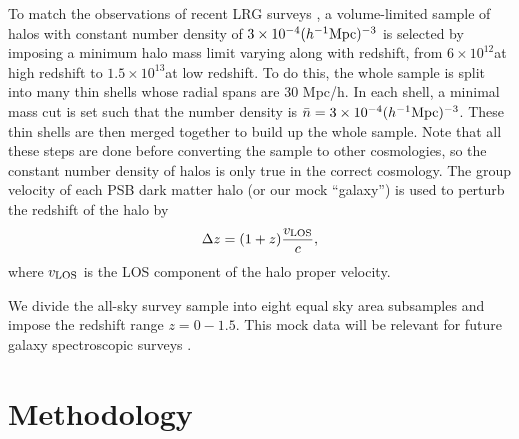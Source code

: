 \documentclass[useAMS,usenatbib]{mn2e}
\newcommand{\hMsun}{{\ifmmode{h^{-1}{\rm
        {M_{\odot}}}}\else{$h^{-1}{\rm{M_{\odot}}}$~}\fi}}
\begin{document}
To match the observations of recent LRG surveys \citep{gott 2008, gott 2009, choi 2010},
a volume-limited sample of halos with constant number density of $3 \times 10^{-4} (h^{-1}{\rm Mpc})^{-3}$
is selected by imposing a minimum halo mass limit varying along with redshift, 
from $6\times 10^{12}$\hMsun at high redshift to $1.5\times 10^{13}$\hMsun at low redshift.
To do this, the whole sample is split into many thin shells whose radial spans are 30 Mpc/h. 
In each shell, a minimal mass cut is set such that the number density is $\bar n=3\times10^{-4}(h^{-1}{\rm Mpc})^{-3}$. 
These thin shells are then merged together to build up the whole sample. 
Note that all these steps are done before converting the sample to other cosmologies, so the constant number density of halos is only true in the correct cosmology.
The group velocity of each PSB dark matter halo (or our mock ``galaxy'') 
is used to perturb the redshift of the halo by 
\begin{equation}
\Delta z = (1+z) \frac{v_{{\rm LOS}}}{c},
\end{equation}
where $v_{\rm LOS}$ is the LOS component of the halo proper velocity.


We divide the all-sky survey sample into eight equal sky area subsamples and impose the redshift range $z=0-1.5$. 
This mock data will be relevant for future galaxy spectroscopic surveys \citep[e.g. DESI ][]{2013arXiv1308.0847L}.


\section{Methodology}
\end{document}

